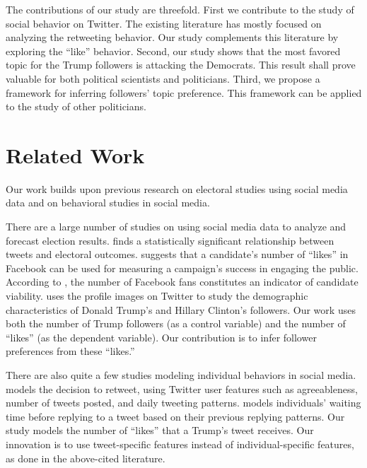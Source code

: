 \documentclass[letterpaper]{article}
\begin{document}
The contributions of our study are threefold. First we contribute to the study of social behavior on Twitter. The existing literature has mostly focused on analyzing the retweeting behavior. Our study complements this literature by exploring the ``like'' behavior. Second, our study shows that the most favored topic for the Trump followers is attacking the Democrats. This result shall prove valuable for both political scientists and politicians. Third, we propose a framework for inferring followers' topic preference. This framework can be applied to the study of other politicians.

\section{Related Work}

Our work builds upon previous research on electoral studies using social media data and on behavioral studies in social media.

There are a large number of studies on using social media data to analyze and forecast election results. \cite{moretweetsmorevotes} finds a statistically significant relationship between tweets and electoral outcomes. \cite{facebookCongress} suggests that a candidate's number of ``likes'' in Facebook can be used for measuring a campaign's success in engaging the public. According to \cite{fbcount}, the number of Facebook fans constitutes an indicator of candidate viability. \cite{trumpists} uses the profile images on Twitter to study the demographic characteristics of Donald Trump's and Hillary Clinton's followers. Our work uses both the number of Trump followers (as a control variable) and the number of ``likes'' (as the dependent variable). Our contribution is to infer follower preferences from these ``likes.''

%

There are also quite a few studies modeling individual behaviors in social media. \cite{retweet} models the decision to retweet, using Twitter user features such as agreeableness, number of tweets posted, and daily tweeting patterns. \cite{answer} models individuals' waiting time before replying to a tweet based on their previous replying patterns. Our study models the number of ``likes'' that a Trump's tweet receives. Our innovation is to use tweet-specific features instead of individual-specific features, as done in the above-cited literature.
\end{document}
